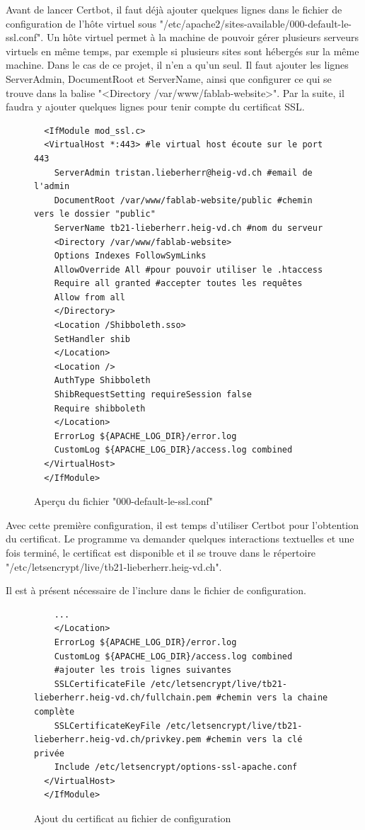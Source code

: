 \documentclass[
    iai, %
    eai, %
]{heig-tb}
\begin{document}
Avant de lancer Certbot, il faut déjà ajouter quelques lignes dans le fichier de configuration de l'hôte virtuel sous "/etc/apache2/sites-available/000-default-le-ssl.conf". Un hôte virtuel permet à la machine de pouvoir gérer plusieurs serveurs virtuels en même temps, par exemple si plusieurs sites sont hébergés sur la même machine. Dans le cas de ce projet, il n'en a qu'un seul.
Il faut ajouter les lignes ServerAdmin, DocumentRoot et ServerName, ainsi que configurer ce qui se trouve dans la balise "<Directory /var/www/fablab-website>". Par la suite, il faudra y ajouter quelques lignes pour tenir compte du certificat SSL.

\begin{figure}[h]
  \begin{verbatim}
  <IfModule mod_ssl.c>
  <VirtualHost *:443> #le virtual host écoute sur le port 443
    ServerAdmin tristan.lieberherr@heig-vd.ch #email de l'admin
    DocumentRoot /var/www/fablab-website/public #chemin vers le dossier "public"
    ServerName tb21-lieberherr.heig-vd.ch #nom du serveur
    <Directory /var/www/fablab-website>
    Options Indexes FollowSymLinks
    AllowOverride All #pour pouvoir utiliser le .htaccess
    Require all granted #accepter toutes les requêtes
    Allow from all
    </Directory>
    <Location /Shibboleth.sso>
    SetHandler shib
    </Location>
    <Location />
    AuthType Shibboleth
    ShibRequestSetting requireSession false
    Require shibboleth
    </Location>
    ErrorLog ${APACHE_LOG_DIR}/error.log
    CustomLog ${APACHE_LOG_DIR}/access.log combined
  </VirtualHost>
  </IfModule>
  \end{verbatim}
  \caption{Aperçu du fichier "000-default-le-ssl.conf"}
\end{figure}

Avec cette première configuration, il est temps d'utiliser Certbot pour l'obtention du certificat. Le programme va demander quelques interactions textuelles et une fois terminé, le certificat est disponible et il se trouve dans le répertoire "/etc/letsencrypt/live/tb21-lieberherr.heig-vd.ch".

\newpage
Il est à présent nécessaire de l'inclure dans le fichier de configuration.

\begin{figure}[h]
  \begin{verbatim}
    ...
    </Location>
    ErrorLog ${APACHE_LOG_DIR}/error.log
    CustomLog ${APACHE_LOG_DIR}/access.log combined
    #ajouter les trois lignes suivantes
    SSLCertificateFile /etc/letsencrypt/live/tb21-lieberherr.heig-vd.ch/fullchain.pem #chemin vers la chaine complète
    SSLCertificateKeyFile /etc/letsencrypt/live/tb21-lieberherr.heig-vd.ch/privkey.pem #chemin vers la clé privée
    Include /etc/letsencrypt/options-ssl-apache.conf
  </VirtualHost>
  </IfModule>
  \end{verbatim}
  \caption{Ajout du certificat au fichier de configuration}
\end{figure}
\end{document}

